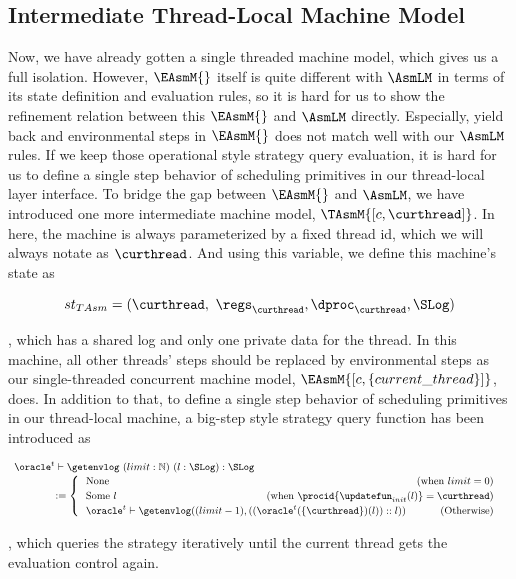 \subsection{Intermediate Thread-Local Machine Model}\label{subsec:tasm}

Now, we have already gotten a single threaded machine model, which gives us a full isolation.
However, $\EAsmM{}$ itself is quite different with $\AsmLM$ in terms of its state definition and evaluation rules,
so it is hard for us to show the refinement relation between this $\EAsmM{}$ and $\AsmLM$ directly. 
Especially, yield back and environmental steps in $\EAsmM{}$ does not match well with our $\AsmLM$ rules. 
If we keep those operational style strategy query evaluation, it is hard for us to define a single step behavior of 
scheduling primitives in our thread-local layer interface.
To bridge the gap between $\EAsmM{}$ and $\AsmLM$,
we have introduced one more intermediate machine model, $\TAsmM{[c, \curthread]}$. 
In here, the machine is always parameterized by a fixed thread id, which we will always notate as $\curthread$. 
And using this variable, we define this machine's state as
\begin{small}
\[
st_{TAsm} = (\curthread, \ \regs_{\curthread}, \dproc_{\curthread}, \SLog) 
\]
\end{small}
, which has a shared log and only one private data for the thread.
In this machine, all other threads' steps should be replaced by environmental steps
as our single-threaded concurrent machine model, $\EAsmM{[c, \{current\_thread\}]}$, does.
In addition to that, to define a single step behavior of scheduling primitives in our thread-local machine, a big-step style strategy query function has 
been introduced as
\begin{tiny}
\[{\small
\begin{array}{l}
\oracle^{t} \vdash \getenvlog\ (limit :\mathbb{N})\ (l: \SLog ):  \SLog  \\
\ \ \ \ \ \ \ \ \ \ \ \ :=
\begin{cases}
\ \ \mathrm{None}\hfill (\mathrm{when} \ limit = 0) \\
\ \ \mathrm{Some} \ l \hfill (\mathrm{when} \ \procid{\updatefun_{init}(l)} = \curthread) \\
\ \ \oracle^{t} \vdash \getenvlog((limit - 1), ((\oracle^{t}(\{\curthread\})(l))::l))\ \ \ \ \  \ \ \ \ \ 
\hfill (\mathrm{Otherwise})\\
\end{cases} 
\end{array}
}\]
\end{tiny}
, which queries the strategy iteratively until the current thread gets the evaluation control again.

